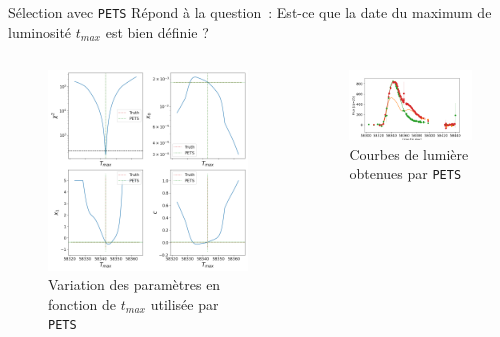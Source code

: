 \documentclass{beamer}
\def\pets{\texttt{PETS}\xspace}
\begin{document}
\begin{frame}{Sélection avec \pets}
Répond à la question~: Est-ce que la date du maximum de luminosité $t_{max}$ est bien définie ? 
\begin{columns}
\begin{column}{.5\textwidth}
\begin{figure}
	\centering
	\includegraphics[width=.8\textwidth]{figures/26_pets_new.png}
	\caption{Variation des paramètres en fonction de $t_{max}$ utilisée par \pets}
\end{figure}
\end{column}

\begin{column}{.5\textwidth}
\begin{figure}
	\centering
	\includegraphics[width=.9\textwidth]{figures/26_lc.png}
	\caption{Courbes de lumière obtenues par \pets}
\end{figure}
\end{column}
\end{columns}
\end{frame}
\end{document}
